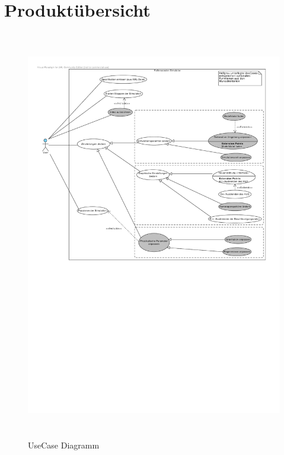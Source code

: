 \chapter{Produktübersicht}

\begin{figure}[!h]%
\includegraphics[width=170mm, height=180mm]{bilder/usecase1}
\caption{UseCase Diagramm}%
\end{figure}
